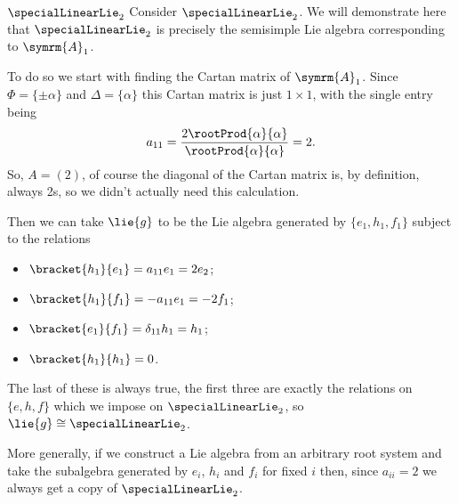 \documentclass[fleqn]{NotesClass}
\newcommand{\isomorphic}{\cong}
\newcommand{\dynkin}[2]{\symrm{#1}_{#2}}
\begin{document}
    \begin{exm}{\(\specialLinearLie_2\)}{}
        Consider \(\specialLinearLie_2\).
        We will demonstrate here that \(\specialLinearLie_2\) is precisely the semisimple Lie algebra corresponding to \(\dynkin{A}{1}\).
        
        To do so we start with finding the Cartan matrix of \(\dynkin{A}{1}\).
        Since \(\Phi = \{\pm\alpha\}\) and \(\Delta = \{\alpha\}\) this Cartan matrix is just \(1 \times 1\), with the single entry being
        \begin{equation}
            a_{1 1} = \frac{2\rootProd{\alpha}{\alpha}}{\rootProd{\alpha}{\alpha}} = 2.
        \end{equation}
        So, \(A = (2)\), of course the diagonal of the Cartan matrix is, by definition, always 2s, so we didn't actually need this calculation.
        
        Then we can take \(\lie{g}\) to be the Lie algebra generated by \(\{e_1, h_1, f_1\}\) subject to the relations
        \begin{itemize}
            \item \(\bracket{h_1}{e_1} = a_{11}e_1 = 2e_2\);
            \item \(\bracket{h_1}{f_1} = -a_{11}e_1 = -2f_1\);
            \item \(\bracket{e_1}{f_1} = \delta_{11}h_1 = h_1\);
            \item \(\bracket{h_1}{h_1} = 0\).
        \end{itemize}
        The last of these is always true, the first three are exactly the relations on \(\{e, h, f\}\) which we impose on \(\specialLinearLie_2\), so \(\lie{g} \isomorphic \specialLinearLie_2\).
        
        More generally, if we construct a Lie algebra from an arbitrary root system and take the subalgebra generated by \(e_i\), \(h_i\) and \(f_i\) for fixed \(i\) then, since \(a_{ii} = 2\) we always get a copy of \(\specialLinearLie_2\).
    \end{exm}
    
\end{document}
